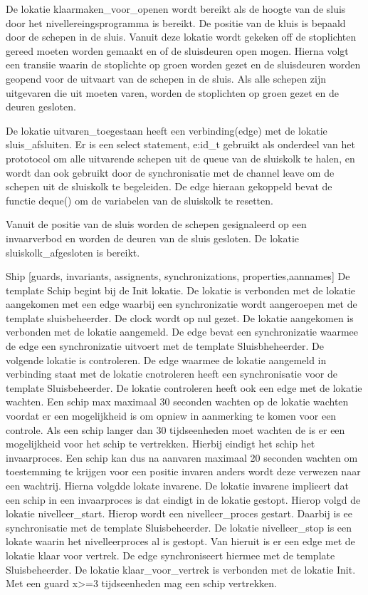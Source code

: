 De lokatie klaarmaken_voor_openen wordt bereikt als de   hoogte van de sluis  door het nivellereingsprogramma is bereikt.
De positie van de kluis is bepaald door de schepen in de sluis. Vanuit deze lokatie wordt gekeken off de stoplichten gereed moeten worden gemaakt en of de sluisdeuren open mogen.
Hierna volgt een transiie waarin de stoplichte op groen worden gezet en de sluisdeuren worden geopend voor de uitvaart van de schepen in de sluis.
Als alle schepen zijn uitgevaren die uit moeten varen, worden de stoplichten op groen gezet en de deuren gesloten.


De lokatie uitvaren_toegestaan heeft een verbinding(edge) met de lokatie sluis_afsluiten.
Er is een select statement, e:id_t gebruikt als onderdeel van het prototocol om alle uitvarende schepen uit de queue van de sluiskolk te halen, en wordt dan ook gebruikt door de synchronisatie met de channel leave om de schepen uit de sluiskolk te begeleiden. De edge hieraan gekoppeld bevat de functie deque() om de variabelen  van de sluiskolk te resetten.

Vanuit de positie van de sluis worden de schepen gesignaleerd op een invaarverbod en worden de deuren van de sluis gesloten.
De lokatie sluiskolk_afgesloten is bereikt.

Ship [guards, invariants, assignents, synchronizations, properties,aannames]
De template Schip begint bij de Init lokatie. De lokatie is verbonden met de lokatie aangekomen met een edge waarbij een synchronizatie wordt aangeroepen met de template sluisbeheerder. De clock wordt op nul gezet. De lokatie aangekomen is verbonden met de lokatie aangemeld. De edge bevat een synchronizatie waarmee de edge een synchronizatie uitvoert met de template Sluisbheheerder.
De volgende lokatie is  controleren. De edge waarmee de lokatie aangemeld in verbinding staat met de lokatie cnotroleren heeft een synchronisatie voor de template Sluisbeheerder. De lokatie controleren heeft ook een edge met de lokatie wachten. Een schip max maximaal 30 seconden wachten op de lokatie wachten voordat er een mogelijkheid is om opniew in aanmerking te komen voor een controle. Als een schip langer dan 30 tijdseenheden moet wachten de is er een mogelijkheid voor het schip te vertrekken. Hierbij eindigt het schip het invaarproces. Een schip kan dus na aanvaren maximaal 20 seconden wachten om toestemming te krijgen voor een positie invaren anders wordt deze verwezen naar een wachtrij.
Hierna volgdde lokate invarene. De lokatie invarene implieert dat een schip in een invaarproces is dat eindigt in de lokatie gestopt.
Hierop volgd de lokatie nivelleer_start. Hierop wordt een nivelleer_proces gestart. Daarbij is ee synchronisatie met de template Sluisbeheerder.
De lokatie nivelleer_stop is een lokate waarin het nivelleerproces al is gestopt. Van hieruit is er een edge met de lokatie klaar voor vertrek. De edge synchroniseert hiermee met de template Sluisbeheerder.
De lokatie klaar_voor_vertrek is verbonden met de lokatie Init. Met een guard x>=3 tijdseenheden mag een schip vertrekken.


